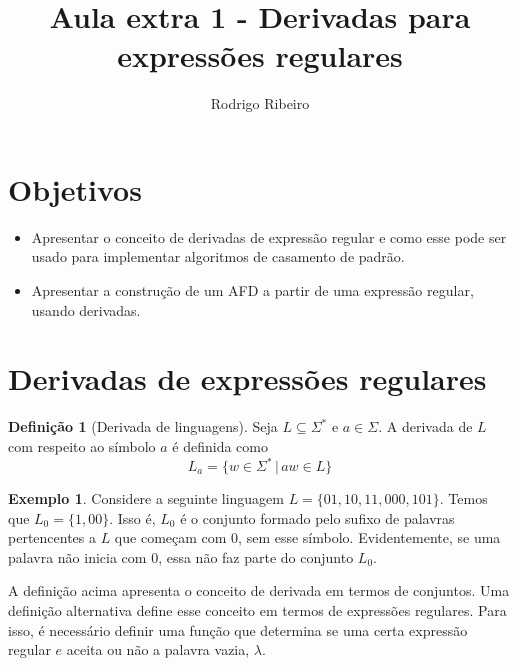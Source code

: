 \documentclass[a4paper]{article}
\theoremstyle{definition}
\newtheorem{Example}{Exemplo}
\newtheorem{Definition}{Definição}
\begin{document}
  \title{Aula extra 1 - Derivadas para expressões regulares}
  \author{Rodrigo Ribeiro}

  \maketitle


  \pagestyle{fancy}


  \section*{Objetivos}

  \begin{itemize}
     \item Apresentar o conceito de derivadas de expressão regular
       e como esse pode ser usado para implementar algoritmos
       de casamento de padrão.
     \item Apresentar a construção de um AFD a partir de uma
          expressão regular, usando derivadas.
  \end{itemize}


  \section{Derivadas de expressões regulares}

  \begin{Definition}[Derivada de linguagens]
    Seja $L \subseteq \Sigma^*$ e $a \in \Sigma$. A derivada
    de $L$ com respeito ao símbolo $a$ é definida como
    \[
      L_a =\{w \in \Sigma^*\,|\, aw \in L\}
    \]
  \end{Definition}

  \begin{Example}
    Considere a seguinte linguagem $L = \{01, 10, 11, 000, 101\}$.
    Temos que $L_0 =\{1, 00\}$. Isso é, $L_0$ é o conjunto formado
    pelo sufixo de palavras pertencentes a $L$ que começam com $0$,
    sem esse símbolo. Evidentemente, se uma palavra não inicia com $0$,
    essa não faz parte do conjunto $L_0$.
  \end{Example}

  A definição acima apresenta o conceito de derivada em termos de conjuntos.
  Uma definição alternativa define esse conceito em termos de expressões
  regulares. Para isso, é necessário definir uma função que determina se
  uma certa expressão regular $e$ aceita ou não a palavra vazia, $\lambda$.
\end{document}
